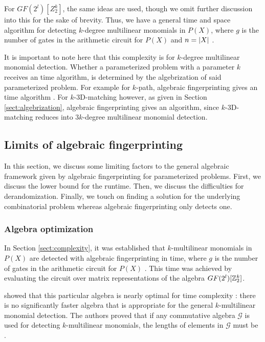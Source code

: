 For $GF(2^{l})[Z_2^k]$, the same ideas are used, though we omit 
further discussion into this for the sake of brevity. 
Thus, we have a general 
 time and  space algorithm for detecting 
$k$-degree multilinear monomials in $P(X)$, where $g$ is the number of gates in the 
arithmetic circuit for $P(X)$ and $n = {\left\vert X\right\vert}$ \cite{KouWil09}.

It is important to note here that this complexity is for $k$-degree 
multilinear monomial detection. Whether a parameterized problem with a parameter 
$k$ receives an  time algorithm, is determined by the algebrization 
of said parameterized problem. 
For example for $k$-path, algebraic fingerprinting gives an  
time algorithm \cite{Williams09}. 
For $k$-3D-matching however, as given in Section \ref{sect:algebrization}, 
algebraic fingerprinting gives an  algorithm, since 
$k$-3D-matching reduces into $3k$-degree multilinear monomial detection.


\subsection{Limits of algebraic fingerprinting}
\label{sect:limits}

In this section, we discuss some limiting factors to the general 
algebraic framework given by 
algebraic fingerprinting for parameterized problems. First, 
we discuss the lower bound for the runtime. Then, we discuss 
the difficulties for derandomization. Finally, we touch on 
finding a solution for the underlying combinatorial problem 
whereas algebraic fingerprinting only detects one.

\subsubsection{Algebra optimization}
\label{sect:algebra_is_optimal}

In Section \ref{sect:complexity}, it was established that $k$-multilinear monomials 
in $P(X)$ are detected with 
algebraic fingerprinting in  time, where 
$g$ is the number of gates in the arithmetic circuit for $P(X)$ \cite{Williams09}. 
This time was achieved by evaluating the circuit over matrix 
representations of the algebra $GF(2^l)[\mathbb Z_2^k]$.

\citeauthor{KouWil09} showed that this particular algebra is nearly optimal 
for time complexity \cite{KouWil09}: there is no significantly faster algebra that 
is appropriate for the general $k$-multilinear monomial detection. 
The authors proved that if any commutative algebra $\mathcal{G}$ is 
used for detecting $k$-multilinear monomials, 
the lengths of elements in $\mathcal{G}$ must be .


